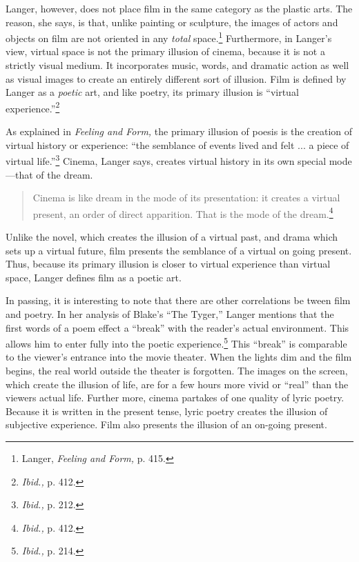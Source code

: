 \documentclass{tufte-handout}
\begin{document}
Langer, however, does not place film in the same category as the plastic
arts. The reason, she says, is that, unlike painting or sculpture, the
images of actors and objects on film are not oriented in any
\emph{total} space.\footnote{Langer, \emph{Feeling and Form,} p. 415.}
Further­more, in Langer's view, virtual space is not the primary illusion
of cinema, because it is not a strictly visual medium. It incorporates
music, words, and dramatic action as well as visual images to create an
entirely different sort of illusion. Film is defined by Langer as a
\emph{poetic} art, and like poetry, its primary illusion is ``virtual
experience.''\footnote{\emph{Ibid.,} p. 412.}

As explained in \emph{Feeling and Form,} the primary illusion of poesis
is the creation of virtual history or experience: ``the semblance of
events lived and felt ... a piece of virtual life.''\footnote{\emph{Ibid.,}
  p. 212.} Cinema, Langer says, creates virtual history in its own
special mode---that of the dream.

\begin{quote}
Cinema is like dream in the mode of its presentation: it creates a
virtual present, an order of direct apparition. That is the mode of the
dream.\footnote{\emph{Ibid.,} p. 412.}
\end{quote}

\noindent Unlike the novel, which creates the illusion of a virtual past, and
drama which sets up a virtual future, film presents the semblance of a
virtual on­ going present. Thus, because its primary illusion is closer
to virtual experi­ence than virtual space, Langer defines film as a
poetic art.

In passing, it is interesting to note that there are other correlations
be­ tween film and poetry. In her analysis of Blake's ``The Tyger,''
Langer men­tions that the first words of a poem effect a ``break'' with
the reader's actual environment. This allows him to enter fully into the
poetic experience.\footnote{\emph{Ibid.,} p. 214.} This ``break'' is
comparable to the viewer's entrance into the movie theater. When the
lights dim and the film begins, the real world outside the theater is
forgotten. The images on the screen, which create the illusion of life,
are for a few hours more vivid or ``real'' than the
viewer\textquotesingle s actual life. Further­ more, cinema partakes of
one quality of lyric poetry. Because it is written in the present tense,
lyric poetry creates the illusion of subjective experi­ence. Film also
presents the illusion of an on-going present.
\end{document}
